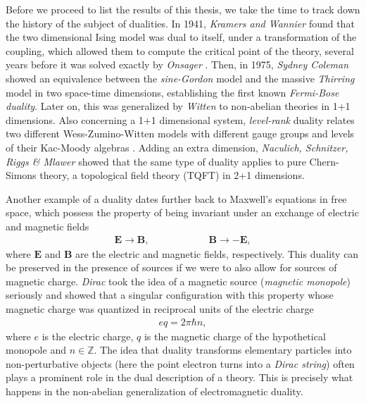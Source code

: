 Before we proceed to list the results of this thesis, we take the time to track down the history of the subject of dualities. In 1941, \textit{Kramers and Wannier} \cite{Kramers:1941kn} found that the two dimensional Ising model was dual to itself, under a transformation of the coupling, which allowed them to compute the critical point of the theory, several years before it was solved exactly by \textit{Onsager} \cite{Onsager:1943jn}.  Then, in 1975, \textit{Sydney Coleman} \cite{Coleman:1974bu} showed an equivalence between the \textit{sine-Gordon} model \cite{Scott1973} and the massive \textit{Thirring} model \cite{Thirring1958} in two space-time dimensions, establishing the first known \textit{Fermi-Bose duality}. Later on, this was generalized by \textit{Witten} \cite{Witten:1983ar} to non-abelian theories in 1+1 dimensions. Also concerning a 1+1 dimensional system, \textit{level-rank} duality relates two different Wess-Zumino-Witten models with different gauge groups and levels of their Kac-Moody algebras \cite{Nakanishi:1990hj, Naculich:1990hg}. Adding an extra dimension, \textit{Naculich, Schnitzer, Riggs \& Mlawer} \cite{Mlawer:1990uv, Naculich:2007nc} showed that the same type of duality applies to pure Chern-Simons theory, a topological field theory (TQFT) in 2+1 dimensions. 

Another example of a duality dates further back to Maxwell's equations in free space, which possess the property of being invariant under an exchange of electric and magnetic fields
\begin{align}
\bm{E}\rightarrow \bm{B}, \qquad\qquad\qquad \bm{B}\rightarrow -\bm{E},
\end{align}
where $\bm{E}$ and $\bm{B}$ are the electric and magnetic fields, respectively. This duality can be preserved in the presence of sources if we were to also allow for sources of magnetic charge. \textit{Dirac} \cite{Dirac:1931kp} took the idea of a magnetic source (\textit{magnetic monopole}) seriously and showed that a singular configuration with this property whose magnetic charge was quantized in reciprocal units of the electric charge
\begin{align}
eq = 2\pi \hbar n,
\end{align}
where $e$ is the electric charge, $q$ is the magnetic charge of the hypothetical monopole and $n \in \mathbb{Z}$. The idea that duality transforms elementary particles into non-perturbative objects (here the point electron turns into a \textit{Dirac string}) often plays a prominent role in the dual description of a theory. This is precisely what happens in the non-abelian generalization of electromagnetic duality.



